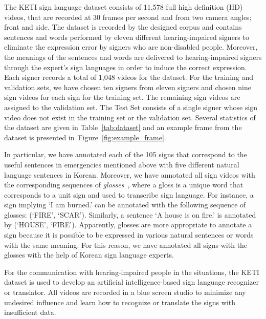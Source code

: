 \documentclass[10pt,twocolumn,letterpaper]{article}
\begin{document}
The KETI sign language dataset consists of 11,578 full high definition (HD) videos, that are recorded at 30 frames per second and from two camera angles; front and side. The dataset is recorded by the designed corpus and contains sentences and words performed by eleven different hearing-impaired signers to eliminate the expression error by signers who are non-disabled people. Moreover, the meanings of the sentences and words are delivered to hearing-impaired signers through the expert's sign languages in order to induce the correct expression.
Each signer records a total of 1,048 videos for the dataset. For the training and validation sets, we have chosen ten signers from eleven signers and chosen nine sign videos for each sign for the training set. The remaining sign videos are assigned to the validation set. The Test Set consists of a single signer whose sign video does not exist in the training set or the validation set. Several statistics of the dataset are given in Table~\ref{tab:dataset} and an example frame from the dataset is presented in~Figure~\ref{fig:example_frame}.

In particular, we have annotated each of the 105 signs that correspond to the useful sentences in emergencies mentioned above with five different natural language sentences in Korean.
Moreover, we have annotated all sign videos with the corresponding sequences of {\em glosses}~\cite{Liddell03}, where a gloss is a unique word that corresponds to a unit sign and used to transcribe sign language. For instance, a sign implying `I am burned.' can be annotated with the following sequence of glosses: (`FIRE', `SCAR'). Similarly, a sentence `A house is on fire.' is annotated by (`HOUSE', `FIRE').
Apparently, glosses are more appropriate to annotate a sign because it is possible to be expressed in various natural sentences or words with the same meaning. For this reason, we have annotated all signs with the glosses with the help of Korean sign language experts.

For the communication with hearing-impaired people in the situations, the KETI dataset is used to develop an artificial intelligence-based sign language recognizer or translator. All videos are recorded in a blue screen studio to minimize any undesired influence and learn how to recognize or translate the signs with insufficient data.



\end{document}

